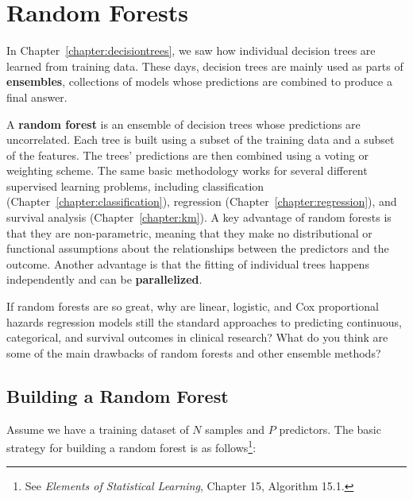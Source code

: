 \chapter{Random Forests \label{chapter:randomforests}}

In Chapter~\ref{chapter:decisiontrees}, we saw how individual decision trees are learned from training data. These days, decision trees are mainly used as parts of \textbf{ensembles}, collections of models whose predictions are combined to produce a final answer. 

A \textbf{random forest} is an ensemble of decision trees whose predictions are uncorrelated. Each tree is built using a subset of the training data and a subset of the features. The trees' predictions are then combined using a voting or weighting scheme. The same basic methodology works for several different supervised learning problems, including classification (Chapter~\ref{chapter:classification}), regression (Chapter~\ref{chapter:regression}), and survival analysis (Chapter~\ref{chapter:km}). A key advantage of random forests is that they are non-parametric, meaning that they make no distributional or functional assumptions about the relationships between the predictors and the outcome. Another advantage is that the fitting of individual trees happens independently and can be \textbf{parallelized}. 

\vspace{4mm}

\begin{question}{}
If random forests are so great, why are linear, logistic, and Cox proportional hazards regression models still the standard approaches to predicting continuous, categorical, and survival outcomes in clinical research? What do you think are some of the main drawbacks of random forests and other ensemble methods?
\end{question}


\section{Building a Random Forest}

Assume we have a training dataset of $N$ samples and $P$ predictors. The basic strategy for building a random forest is as follows\footnote{See \emph{Elements of Statistical Learning}, Chapter 15, Algorithm 15.1.}:


